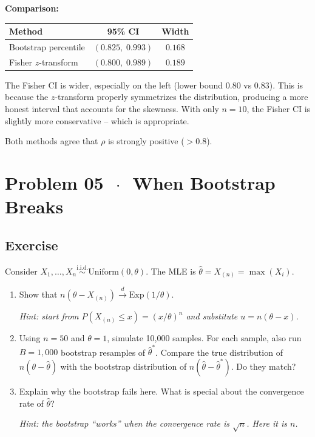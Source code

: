 \documentclass[11pt]{article}
\begin{document}
\textbf{Comparison:}
\begin{center}
\begin{tabular}{@{}lcc@{}}
\toprule
\textbf{Method} & \textbf{95\% CI} & \textbf{Width} \\
\midrule
Bootstrap percentile & $(0.825,\; 0.993)$ & $0.168$ \\
Fisher $z$-transform & $(0.800,\; 0.989)$ & $0.189$ \\
\bottomrule
\end{tabular}
\end{center}

The Fisher CI is wider, especially on the left (lower bound 0.80 vs 0.83). This is because the $z$-transform properly symmetrizes the distribution, producing a more honest interval that accounts for the skewness. With only $n = 10$, the Fisher CI is slightly more conservative -- which is appropriate.

Both methods agree that $\rho$ is strongly positive ($> 0.8$).

\section*{Problem 05 \texorpdfstring{$\,\cdot\,$}{-} When Bootstrap Breaks}

\subsection*{Exercise}

Consider $X_1, \ldots, X_n \overset{\text{i.i.d.}}{\sim} \text{Uniform}(0, \theta)$. The MLE is $\hat{\theta} = X_{(n)} = \max(X_i)$.

\begin{enumerate}[label=\alph*)]
  \item Show that $n(\theta - X_{(n)}) \xrightarrow{d} \text{Exp}(1/\theta)$.

  \emph{Hint: start from $P(X_{(n)} \leq x) = (x/\theta)^n$ and substitute $u = n(\theta - x)$.}
  \item Using $n = 50$ and $\theta = 1$, simulate 10,000 samples. For each sample, also run $B = 1{,}000$ bootstrap resamples of $\hat{\theta}^*$. Compare the true distribution of $n(\theta - \hat{\theta})$ with the bootstrap distribution of $n(\hat{\theta} - \hat{\theta}^*)$. Do they match?
  \item Explain why the bootstrap fails here. What is special about the convergence rate of $\hat{\theta}$?

  \emph{Hint: the bootstrap ``works'' when the convergence rate is $\sqrt{n}$. Here it is $n$.}
\end{enumerate}
\end{document}
